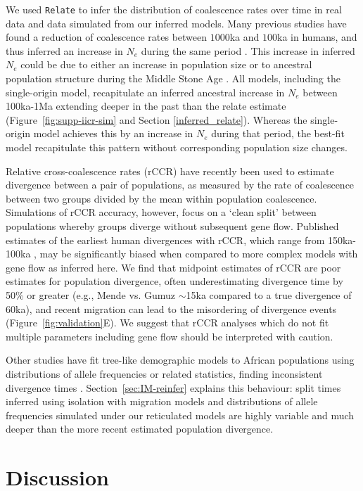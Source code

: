 \documentclass[]{article}
\begin{document}
We used \texttt{Relate} \citep{Speidel2019-nj} to infer the distribution of
coalescence rates over time in real data and data simulated from our inferred models. Many 
previous studies have found a reduction of coalescence rates 
between $1000$ka and $100$ka in humans, and thus inferred an increase 
in $N_e$ during the same period \citep{Li2011-le}.
This increase in inferred $N_e$ could be due to either an increase in population size or to 
ancestral population structure during the Middle Stone Age \citep{Mazet2015-wn}.
All models, including the
single-origin model, recapitulate an inferred ancestral
increase in $N_e$ between 100ka-1Ma extending deeper in the past than the relate estimate (Figure~\ref{fig:supp-iicr-sim} and Section \ref{inferred_relate}).
Whereas the single-origin model achieves this by
an increase in $N_e$ during that period, the best-fit model recapitulate
this pattern without corresponding population size changes.     

Relative cross-coalescence rates (rCCR) have recently been used to estimate
divergence between a pair of populations, as measured by the rate of
coalescence between two groups divided by the mean within population
coalescence. Simulations of rCCR accuracy, however, focus on a ‘clean split’
between populations whereby groups diverge without subsequent gene flow.
Published estimates of the earliest human divergences with rCCR, which range
from 150ka-100ka \citep{Bergstrom2021-iw}, may be significantly biased when
compared to more complex models with gene flow as inferred here. We find that
midpoint estimates of rCCR are poor estimates for population divergence, often
underestimating divergence time by 50\% or greater (e.g., Mende vs. Gumuz
$\sim$15ka compared to a true divergence of 60ka), and recent migration can
lead to the misordering of divergence events (Figure~\ref{fig:validation}E). We suggest
that rCCR analyses which do not fit multiple parameters including gene flow
should be interpreted with caution.

Other studies have fit tree-like demographic models to African populations using 
distributions of allele frequencies or related statistics,
finding inconsistent divergence times \cite{Henn2018, Bergstrom2021}.
Section~\ref{sec:IM-reinfer} explains this behaviour:
split times inferred using isolation with migration models and
distributions of allele frequencies simulated under our reticulated
models are highly variable and much deeper than the more recent
estimated population divergence. 

\section*{Discussion}
\end{document}

